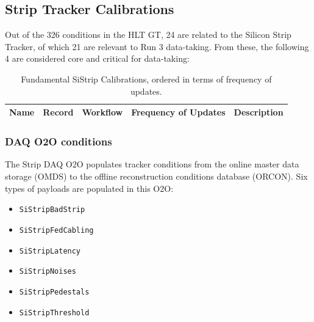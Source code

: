 \subsection{Strip Tracker Calibrations}

Out of the 326 conditions in the HLT GT, 24 are related to the Silicon Strip Tracker, of which 21 are relevant to Run 3 data-taking. From these, the following 4 are considered core and critical for data-taking:

\begin{table}[h!]
    \centering
    \begin{adjustbox}{max width=\textwidth}
    \begin{tabular}{p{3.5cm}|p{4cm}|p{2.5cm}|p{2cm}|p{4.5cm}}
        \textbf{Name} & \textbf{Record} & \textbf{Workflow} & \textbf{Frequency of Updates} & \textbf{Description} \\ \hline
    \end{tabular}
    \end{adjustbox}
    \caption{Fundamental SiStrip Calibrations, ordered in terms of frequency of updates.}
    \label{tab:StripCalibrations_critical}
\end{table}

\subsubsection{DAQ O2O conditions}
 The Strip DAQ O2O populates tracker conditions from the online master data storage (OMDS) to the offline reconstruction conditions database (ORCON). 
Six types of payloads are populated in this O2O: 
\begin{itemize}
\item \texttt{SiStripBadStrip} 	
\item \texttt{SiStripFedCabling} 	
\item \texttt{SiStripLatency} 	
\item \texttt{SiStripNoises} 	
\item \texttt{SiStripPedestals} 	
\item \texttt{SiStripThreshold}
\end{itemize}

